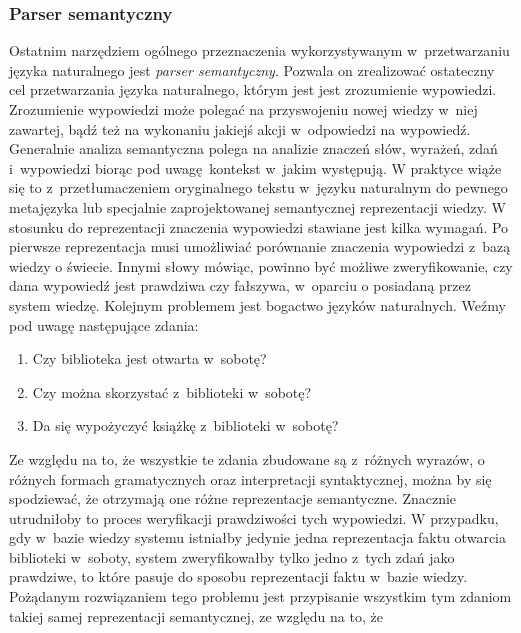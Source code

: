 \documentclass[a4paper, twoside, 12pt]{report}
\begin{document}
            \subsubsection{Parser semantyczny}
                Ostatnim narzędziem ogólnego przeznaczenia wykorzystywanym w~przetwarzaniu języka naturalnego jest
                \emph{parser semantyczny}. Pozwala on zrealizować ostateczny cel przetwarzania języka naturalnego, którym
                jest jest zrozumienie wypowiedzi. Zrozumienie wypowiedzi może polegać na przyswojeniu nowej wiedzy w~niej
                zawartej, bądź też na wykonaniu jakiejś akcji w~odpowiedzi na wypowiedź. Generalnie analiza semantyczna
                polega na analizie znaczeń słów, wyrażeń, zdań i~wypowiedzi biorąc pod uwagę kontekst w~jakim występują.
                W praktyce wiąże się to z~przetłumaczeniem oryginalnego tekstu w~języku naturalnym do pewnego metajęzyka
                lub specjalnie zaprojektowanej semantycznej reprezentacji wiedzy. W stosunku do reprezentacji znaczenia
                wypowiedzi stawiane jest kilka wymagań. Po pierwsze reprezentacja musi umożliwiać porównanie znaczenia wypowiedzi
                z~bazą wiedzy o świecie. Innymi słowy mówiąc, powinno być możliwe zweryfikowanie, czy dana wypowiedź jest
                prawdziwa czy fałszywa, w~oparciu o posiadaną przez system wiedzę. Kolejnym problemem jest bogactwo języków
                naturalnych. Weźmy pod uwagę następujące zdania:
                \begin{enumerate}
                    \item Czy biblioteka jest otwarta w~sobotę?
                    \item Czy można skorzystać z~biblioteki w~sobotę?
                    \item Da się wypożyczyć książkę z~biblioteki w~sobotę?
                \end{enumerate}
                Ze względu na to, że wszystkie te zdania zbudowane są z~różnych wyrazów, o różnych formach gramatycznych oraz
                interpretacji syntaktycznej, można by się spodziewać, że otrzymają one różne reprezentacje semantyczne. Znacznie
                utrudniłoby to proces weryfikacji prawdziwości tych wypowiedzi. W przypadku, gdy w~bazie wiedzy systemu istniałby
                jedynie jedna reprezentacja faktu otwarcia biblioteki w~soboty, system zweryfikowałby tylko jedno z~tych zdań
                jako prawdziwe, to które pasuje do sposobu reprezentacji faktu w~bazie wiedzy. Pożądanym rozwiązaniem tego
                problemu jest przypisanie wszystkim tym zdaniom takiej samej reprezentacji semantycznej, ze względu na to, że
\end{document}
